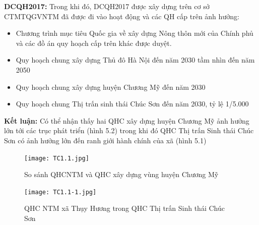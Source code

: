 \documentclass[../thesis.tex]{subfiles}
\begin{document}
\textbf{DCQH2017:} Trong khi đó, DCQH2017 được xây dựng trên cơ sở CTMTQGVNTM đã được đi vào hoạt động và các QH cấp trên ảnh hưởng:
\begin{itemize}
\item Chương trình mục tiêu Quốc gia về xây dựng Nông thôn mới của Chính phủ và các đồ án quy hoạch cấp trên khác được duyệt.  
\item Quy hoạch chung xây dựng Thủ đô Hà Nội đến năm 2030 tầm nhìn đến năm 2050
\item Quy hoạch chung xây dựng huyện Chương Mỹ đến năm 2030
\item Quy hoạch chung Thị trấn sinh thái Chúc Sơn đến năm 2030, tỷ lệ 1/5.000\\ 
\end{itemize}
\textbf{Kết luận:} Có thể nhận thấy hai QHC xây dựng huyện Chương Mỹ ảnh hưởng lớn tới các trục phát triển (hình 5.2)  trong khi đó QHC Thị trấn Sinh thái Chúc Sơn có ảnh hưởng lớn đến ranh giới hành chính của xã (hình 5.1) \\
\clearpage

\begin{figure}
\texttt{[image: TC1.1.jpg]}\caption{So sánh QHCNTM và QHC xây dựng vùng huyện Chương Mỹ}
\end{figure}

\begin{figure}[h!]\texttt{[image: TC1.1-1.jpg]}
\caption{QHC NTM xã Thụy Hương trong QHC Thị trấn Sinh thái Chúc Sơn}
\end{figure}
\end{document}
